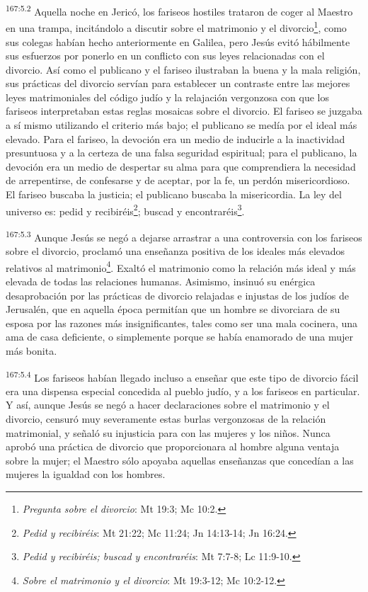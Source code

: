 \par 
\textsuperscript{167:5.2} Aquella noche en Jericó, los fariseos hostiles trataron de coger al Maestro en una trampa, incitándolo a discutir sobre el matrimonio y el divorcio\footnote{\textit{Pregunta sobre el divorcio}: Mt 19:3; Mc 10:2.}, como sus colegas habían hecho anteriormente en Galilea, pero Jesús evitó hábilmente sus esfuerzos por ponerlo en un conflicto con sus leyes relacionadas con el divorcio. Así como el publicano y el fariseo ilustraban la buena y la mala religión, sus prácticas del divorcio servían para establecer un contraste entre las mejores leyes matrimoniales del código judío y la relajación vergonzosa con que los fariseos interpretaban estas reglas mosaicas sobre el divorcio. El fariseo se juzgaba a sí mismo utilizando el criterio más bajo; el publicano se medía por el ideal más elevado. Para el fariseo, la devoción era un medio de inducirle a la inactividad presuntuosa y a la certeza de una falsa seguridad espiritual; para el publicano, la devoción era un medio de despertar su alma para que comprendiera la necesidad de arrepentirse, de confesarse y de aceptar, por la fe, un perdón misericordioso. El fariseo buscaba la justicia; el publicano buscaba la misericordia. La ley del universo es: pedid y recibiréis\footnote{\textit{Pedid y recibiréis}: Mt 21:22; Mc 11:24; Jn 14:13-14; Jn 16:24.}; buscad y encontraréis\footnote{\textit{Pedid y recibiréis; buscad y encontraréis}: Mt 7:7-8; Lc 11:9-10.}.

\par 
\textsuperscript{167:5.3} Aunque Jesús se negó a dejarse arrastrar a una controversia con los fariseos sobre el divorcio, proclamó una enseñanza positiva de los ideales más elevados relativos al matrimonio\footnote{\textit{Sobre el matrimonio y el divorcio}: Mt 19:3-12; Mc 10:2-12.}. Exaltó el matrimonio como la relación más ideal y más elevada de todas las relaciones humanas. Asimismo, insinuó su enérgica desaprobación por las prácticas de divorcio relajadas e injustas de los judíos de Jerusalén, que en aquella época permitían que un hombre se divorciara de su esposa por las razones más insignificantes, tales como ser una mala cocinera, una ama de casa deficiente, o simplemente porque se había enamorado de una mujer más bonita.

\par 
\textsuperscript{167:5.4} Los fariseos habían llegado incluso a enseñar que este tipo de divorcio fácil era una dispensa especial concedida al pueblo judío, y a los fariseos en particular. Y así, aunque Jesús se negó a hacer declaraciones sobre el matrimonio y el divorcio, censuró muy severamente estas burlas vergonzosas de la relación matrimonial, y señaló su injusticia para con las mujeres y los niños. Nunca aprobó una práctica de divorcio que proporcionara al hombre alguna ventaja sobre la mujer; el Maestro sólo apoyaba aquellas enseñanzas que concedían a las mujeres la igualdad con los hombres.

